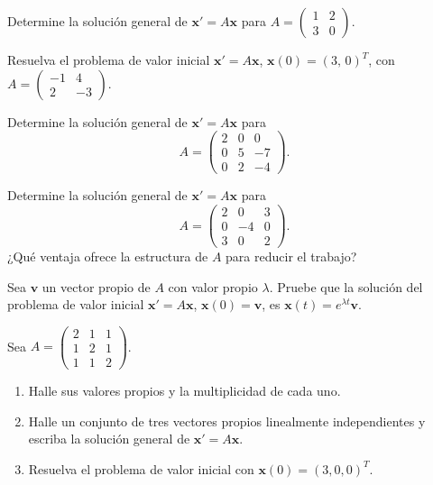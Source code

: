 \begin{exercise}[\est{1}]\label{ex:E2}
Determine la solución general de $\mathbf{x}' = A\mathbf{x}$ para $A = \begin{pmatrix} 1 & 2\\ 3 & 0\end{pmatrix}$.
\end{exercise}

\begin{exercise}[\est{2}]\label{ex:E3}
Resuelva el problema de valor inicial $\mathbf{x}' = A\mathbf{x}$, $\mathbf{x}(0) = (3,\,0)^T$, con $A = \begin{pmatrix} -1 & 4\\ 2 & -3\end{pmatrix}$.
\end{exercise}

\begin{exercise}[\est{2}]\label{ex:E4}
Determine la solución general de $\mathbf{x}' = A\mathbf{x}$ para
\[
A = \begin{pmatrix} 2 & 0 & 0\\ 0 & 5 & -7\\ 0 & 2 & -4\end{pmatrix}.
\]
\end{exercise}

\begin{exercise}[\est{2}]\label{ex:E5}
Determine la solución general de $\mathbf{x}' = A\mathbf{x}$ para
\[
A = \begin{pmatrix} 2 & 0 & 3\\ 0 & -4 & 0\\ 3 & 0 & 2\end{pmatrix}.
\]
¿Qué ventaja ofrece la estructura de $A$ para reducir el trabajo?
\end{exercise}

\begin{exercise}[\est{2}]\label{ex:E6}
Sea $\mathbf{v}$ un vector propio de $A$ con valor propio $\lambda$. Pruebe que la solución del problema de valor inicial $\mathbf{x}' = A\mathbf{x}$, $\mathbf{x}(0) = \mathbf{v}$, es $\mathbf{x}(t) = e^{\lambda t}\mathbf{v}$.
\end{exercise}

\begin{exercise}[\est{3}]\label{ex:E7}
Sea $A = \begin{pmatrix} 2 & 1 & 1\\ 1 & 2 & 1\\ 1 & 1 & 2\end{pmatrix}$.
\begin{enumerate}[a]
    \item Halle sus valores propios y la multiplicidad de cada uno.
    \item Halle un conjunto de tres vectores propios linealmente independientes y escriba la solución general de $\mathbf{x}' = A\mathbf{x}$.
    \item Resuelva el problema de valor inicial con $\mathbf{x}(0) = (3,0,0)^T$.
\end{enumerate}
\end{exercise}

